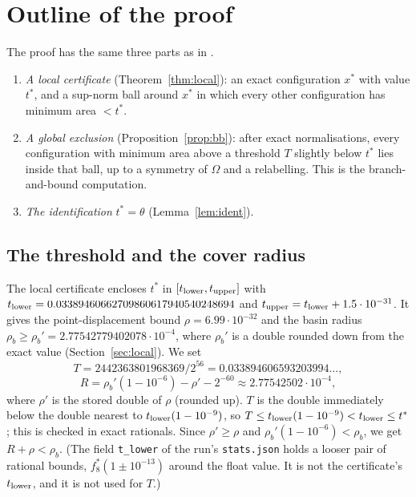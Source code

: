 \documentclass[11pt]{amsart}
\theoremstyle{definition}
\newcommand{\tstar}{t^{*}}
\newcommand{\Om}{\Omega}
\begin{document}
\section{Outline of the proof}\label{sec:outline}

The proof has the same three parts as in \cite{N9}.
\begin{enumerate}[label=(\Alph*)]
\item \emph{A local certificate} (Theorem~\ref{thm:local}): an exact configuration $x^*$ with value $\tstar$, and a sup-norm ball around $x^*$ in which every other configuration has minimum area $< \tstar$.
\item \emph{A global exclusion} (Proposition~\ref{prop:bb}): after exact normalisations, every configuration with minimum area above a threshold $T$ slightly below $\tstar$ lies inside that ball, up to a symmetry of $\Om$ and a relabelling. This is the branch-and-bound computation.
\item \emph{The identification} $\tstar = \theta$ (Lemma~\ref{lem:ident}).
\end{enumerate}

\subsection{The threshold and the cover radius}\label{sec:thresholds}
The local certificate encloses $\tstar$ in $[t_{\rm lower}, t_{\rm upper}]$ with $t_{\rm lower} = 0.03389460662709860617940540248694$ and $t_{\rm upper} = t_{\rm lower} + 1.5\cdot10^{-31}$. It gives the point-displacement bound $\rho = 6.99\cdot10^{-32}$ and the basin radius $\rho_b \ge \rho_b' = 2.77542779402078\cdot10^{-4}$, where $\rho_b'$ is a double rounded down from the exact value (Section~\ref{sec:local}). %
We set
\[
 T = 2442363801968369/2^{56} = 0.033894606593203994\ldots,\]
\[ R = \rho_b'(1 - 10^{-6}) - \rho' - 2^{-60} \approx 2.77542502\cdot10^{-4},
\]
where $\rho'$ is the stored double of $\rho$ (rounded up). $T$ is the double immediately below the double nearest to $t_{\rm lower}(1-10^{-9})$, so $T \le t_{\rm lower}(1 - 10^{-9}) < t_{\rm lower} \le \tstar$; this is checked in exact rationals. Since $\rho' \ge \rho$ and $\rho_b'(1-10^{-6}) < \rho_b$, we get $R + \rho < \rho_b$. %
(The field \texttt{t\_lower} of the run's \texttt{stats.json} holds a looser pair of rational bounds, $f^*_8(1 \pm 10^{-13})$ around the float value. It is not the certificate's $t_{\rm lower}$, and it is not used for $T$.) %
\end{document}
